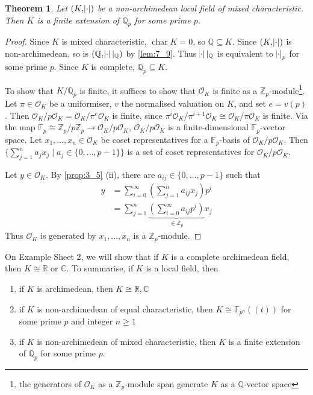 \documentclass[11pt]{article}
\theoremstyle{definition}
\theoremstyle{plain}
\newtheorem{theorem}[definition]{Theorem}
\theoremstyle{remark}
\DeclareMathOperator{\Char}{char}
\newcommand{\bF}{\mathbb{F}}
\newcommand{\bZ}{\mathbb{Z}}
\newcommand{\bQ}{\mathbb{Q}}
\newcommand{\bR}{\mathbb{R}}
\newcommand{\bC}{\mathbb{C}}
\newcommand{\cO}{\mathcal{O}}
\begin{document}
\begin{theorem}\label{thm:7_11}
    Let $(K, \abs{\cdot})$ be a non-archimedean local field of mixed characteristic. Then $K$ is a finite extension of $\bQ_p$ for some prime $p$.
\end{theorem}
\begin{proof}
    Since $K$ is mixed characteristic, $\Char{K} = 0$, so $\bQ \subseteq K$. Since $(K, \abs{\cdot})$ is non-archimedean, so is $(\bQ, \abs{\cdot} \vert_\bQ)$ by \autoref{lem:7_9}. Thus $\abs{\cdot} \vert_\bQ$ is equivalent to $\abs{\cdot}_p$ for some prime $p$. Since $K$ is complete, $\bQ_p \subseteq K$.

    To show that $K / \bQ_p$ is finite, it suffices to show that $\cO_K$ is finite as a $\bZ_p$-module\footnote{the generators of $\cO_K$ as a $\bZ_p$-module span generate $K$ as a $\bQ$-vector space}. Let $\pi \in \cO_K$ be a uniformiser, $v$ the normalised valuation on $K$, and set $e = v(p)$. Then $\cO_K / p \cO_K = \cO_K / \pi^e \cO_K$ is finite, since $\pi^i \cO_K / \pi^{i+1} \cO_K \cong \cO_K / \pi \cO_K$ is finite. Via the map $\bF_p \cong \bZ_p / p \bZ_p \to \cO_K / p \cO_K$, $\cO_K / p \cO_K$ is a finite-dimensional $\bF_p$-vector space. Let $x_1, \ldots, x_n \in \cO_K$ be coset representatives for a $\bF_p$-basis of $\cO_K / p \cO_K$. Then $\{\sum_{j=1}^n a_j x_j \mid a_j \in \{0, \ldots, p-1\}\}$ is a set of coset representatives for $\cO_K / p \cO_K$.

    Let $y \in \cO_K$. By \autoref{prop:3_5} (ii), there are $a_{ij} \in \{0, \ldots, p-1\}$ such that
    \begin{align*}
        y
        &= \sum_{i=0}^\infty \left(\sum_{j=1}^n a_{ij} x_j\right) p^i\\
        &= \sum_{j=1}^n \underbrace{\left(\sum_{i=0}^\infty a_{ij} p^i\right)}_{\in \bZ_p} x_j
    \end{align*}
    Thus $\cO_K$ is generated by $x_1, \ldots, x_n$ is a $\bZ_p$-module.
\end{proof}

On Example Sheet 2, we will show that if $K$ is a complete archimedean field, then $K \cong \bR$ or $\bC$. To summarise, if $K$ is a local field, then
\begin{enumerate}
    \item if $K$ is archimedean, then $K \cong \bR, \bC$
    \item if $K$ is non-archimedean of equal characteristic, then $K \cong \bF_{p^n}((t))$ for some prime $p$ and integer $n \ge 1$
    \item if $K$ is non-archimedean of mixed characteristic, then $K$ is a finite extension of $\bQ_p$ for some prime $p$.
\end{enumerate}
\end{document}
